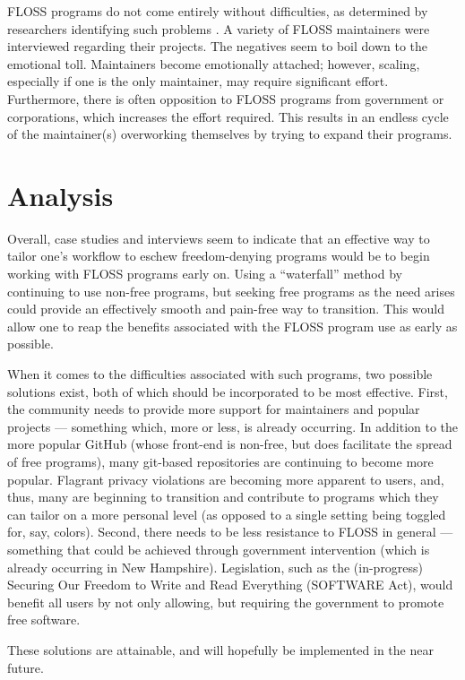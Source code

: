\documentclass[conference]{IEEEtran}
\begin{document}
FLOSS programs do not come entirely without difficulties, as determined by researchers identifying such problems \cite{Labor}. A variety of FLOSS maintainers were interviewed regarding their projects. The negatives seem to boil down to the emotional toll. Maintainers become emotionally attached; however, scaling, especially if one is the only maintainer, may require significant effort. Furthermore, there is often opposition to FLOSS programs from government or corporations, which increases the effort required. This results in an endless cycle of the maintainer(s) overworking themselves by trying to expand their programs.

\section{Analysis}

Overall, case studies and interviews seem to indicate that an effective way to tailor one's workflow to eschew freedom-denying programs would be to begin working with FLOSS programs early on. Using a ``waterfall'' method by continuing to use non-free programs, but seeking free programs as the need arises could provide an effectively smooth and pain-free way to transition. This would allow one to reap the benefits associated with the FLOSS program use as early as possible.

When it comes to the difficulties associated with such programs, two possible solutions exist, both of which should be incorporated to be most effective. First, the community needs to provide more support for maintainers and popular projects — something which, more or less, is already occurring. In addition to the more popular GitHub (whose front-end is non-free, but does facilitate the spread of free programs), many git-based repositories are continuing to become more popular. Flagrant privacy violations are becoming more apparent to users, and, thus, many are beginning to transition and contribute to programs which they can tailor on a more personal level (as opposed to a single setting being toggled for, say, colors). Second, there needs to be less resistance to FLOSS in general — something that could be achieved through government intervention (which is already occurring in New Hampshire). Legislation, such as the (in-progress) Securing Our Freedom to Write and Read Everything (SOFTWARE Act), would benefit all users by not only allowing, but requiring the government to promote free software.

These solutions are attainable, and will hopefully be implemented in the near future.
\end{document}
